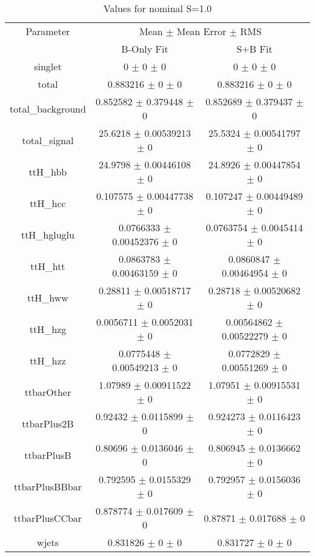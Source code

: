 \begin{table}
\centering
\caption{Values for nominal S=1.0}
\begin{tabular}{ccc}
\toprule
Parameter & \multicolumn{2}{c}{Mean $\pm$ Mean Error $\pm$ RMS}\\
 & B-Only Fit & S+B Fit\\
\midrule
singlet & \num{0} $\pm$ \num{0} $\pm$ \num{0} & \num{0} $\pm$ \num{0} $\pm$ \num{0}\\
total & \num{0.883216} $\pm$ \num{0} $\pm$ \num{0} & \num{0.883216} $\pm$ \num{0} $\pm$ \num{0}\\
total\_background & \num{0.852582} $\pm$ \num{0.379448} $\pm$ \num{0} & \num{0.852689} $\pm$ \num{0.379437} $\pm$ \num{0}\\
total\_signal & \num{25.6218} $\pm$ \num{0.00539213} $\pm$ \num{0} & \num{25.5324} $\pm$ \num{0.00541797} $\pm$ \num{0}\\
ttH\_hbb & \num{24.9798} $\pm$ \num{0.00446108} $\pm$ \num{0} & \num{24.8926} $\pm$ \num{0.00447854} $\pm$ \num{0}\\
ttH\_hcc & \num{0.107575} $\pm$ \num{0.00447738} $\pm$ \num{0} & \num{0.107247} $\pm$ \num{0.00449489} $\pm$ \num{0}\\
ttH\_hgluglu & \num{0.0766333} $\pm$ \num{0.00452376} $\pm$ \num{0} & \num{0.0763754} $\pm$ \num{0.0045414} $\pm$ \num{0}\\
ttH\_htt & \num{0.0863783} $\pm$ \num{0.00463159} $\pm$ \num{0} & \num{0.0860847} $\pm$ \num{0.00464954} $\pm$ \num{0}\\
ttH\_hww & \num{0.28811} $\pm$ \num{0.00518717} $\pm$ \num{0} & \num{0.28718} $\pm$ \num{0.00520682} $\pm$ \num{0}\\
ttH\_hzg & \num{0.0056711} $\pm$ \num{0.0052031} $\pm$ \num{0} & \num{0.00564862} $\pm$ \num{0.00522279} $\pm$ \num{0}\\
ttH\_hzz & \num{0.0775448} $\pm$ \num{0.00549213} $\pm$ \num{0} & \num{0.0772829} $\pm$ \num{0.00551269} $\pm$ \num{0}\\
ttbarOther & \num{1.07989} $\pm$ \num{0.00911522} $\pm$ \num{0} & \num{1.07951} $\pm$ \num{0.00915531} $\pm$ \num{0}\\
ttbarPlus2B & \num{0.92432} $\pm$ \num{0.0115899} $\pm$ \num{0} & \num{0.924273} $\pm$ \num{0.0116423} $\pm$ \num{0}\\
ttbarPlusB & \num{0.80696} $\pm$ \num{0.0136046} $\pm$ \num{0} & \num{0.806945} $\pm$ \num{0.0136662} $\pm$ \num{0}\\
ttbarPlusBBbar & \num{0.792595} $\pm$ \num{0.0155329} $\pm$ \num{0} & \num{0.792957} $\pm$ \num{0.0156036} $\pm$ \num{0}\\
ttbarPlusCCbar & \num{0.878774} $\pm$ \num{0.017609} $\pm$ \num{0} & \num{0.87871} $\pm$ \num{0.017688} $\pm$ \num{0}\\
wjets & \num{0.831826} $\pm$ \num{0} $\pm$ \num{0} & \num{0.831727} $\pm$ \num{0} $\pm$ \num{0}\\
\bottomrule
\end{tabular}
\end{table}